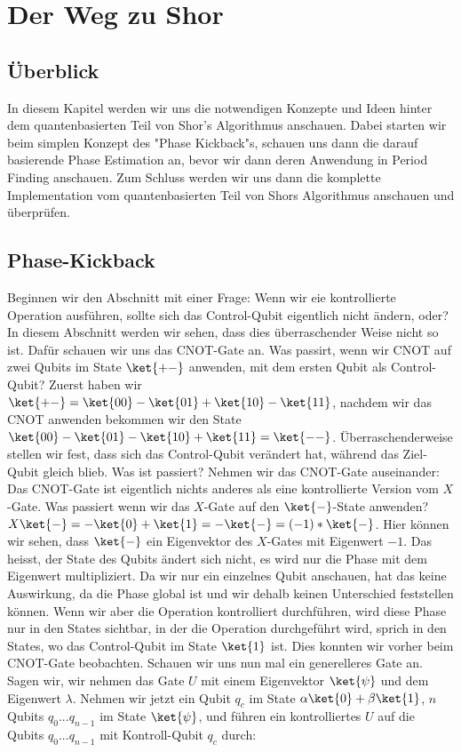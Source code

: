 \chapter{Der Weg zu Shor}
\section{Überblick}
In diesem Kapitel werden wir uns die notwendigen Konzepte und Ideen hinter dem quantenbasierten Teil von Shor's Algorithmus anschauen. Dabei starten wir beim simplen Konzept des "Phase Kickback"s, schauen uns dann die darauf basierende Phase Estimation an, bevor wir dann deren Anwendung in Period Finding anschauen. Zum Schluss werden wir uns dann die komplette Implementation vom quantenbasierten Teil von Shors Algorithmus anschauen und überprüfen.
\section{Phase-Kickback}
Beginnen wir den Abschnitt mit einer Frage: Wenn wir eie kontrollierte Operation ausführen, sollte sich das Control-Qubit eigentlich nicht ändern, oder? In diesem Abschnitt werden wir sehen, dass dies überraschender Weise nicht so ist. Dafür schauen wir uns das CNOT-Gate an. Was passirt, wenn wir CNOT auf zwei Qubits im State $\ket{+-}$ anwenden, mit dem ersten Qubit als Control-Qubit? Zuerst haben wir $\ket{+-} = \ket{00} - \ket{01} + \ket{10} - \ket{11}$, nachdem wir das CNOT anwenden bekommen wir den State $\ket{00} - \ket{01} - \ket{10} + \ket{11} = \ket{--}$. Überraschenderweise stellen wir fest, dass sich das Control-Qubit verändert hat, während das Ziel-Qubit gleich blieb. Was ist passiert? Nehmen wir das CNOT-Gate auseinander: Das CNOT-Gate ist eigentlich nichts anderes als eine kontrollierte Version vom $X$-Gate. Was passiert wenn wir das $X$-Gate auf den $\ket{-}$-State anwenden? $X\ket{-} = -\ket{0} + \ket{1} = -\ket{-} = (-1)*\ket{-}$. Hier können wir sehen, dass $\ket{-}$ ein Eigenvektor des $X$-Gates mit Eigenwert $-1$. Das heisst, der State des Qubits ändert sich nicht, es wird nur die Phase mit dem Eigenwert multipliziert. Da wir nur ein einzelnes Qubit anschauen, hat das keine Auswirkung, da die Phase global ist und wir dehalb keinen Unterschied feststellen können. Wenn wir aber die Operation kontrolliert durchführen, wird diese Phase nur in den States sichtbar, in der die Operation durchgeführt wird, sprich in den States, wo das Control-Qubit im State $\ket{1}$ ist. Dies konnten wir vorher beim CNOT-Gate beobachten. Schauen wir uns nun mal ein generelleres Gate an. Sagen wir, wir nehmen das Gate $U$ mit einem Eigenvektor $\ket{\psi}$ und dem Eigenwert $\lambda$. Nehmen wir jetzt ein Qubit $q_c$ im State $\alpha\ket{0} + \beta\ket{1}$, $n$ Qubits $q_0 ... q_{n-1}$ im State $\ket{\psi}$, und führen ein kontrolliertes $U$ auf die Qubits $q_0 ... q_{n-1}$ mit Kontroll-Qubit $q_c$ durch:
